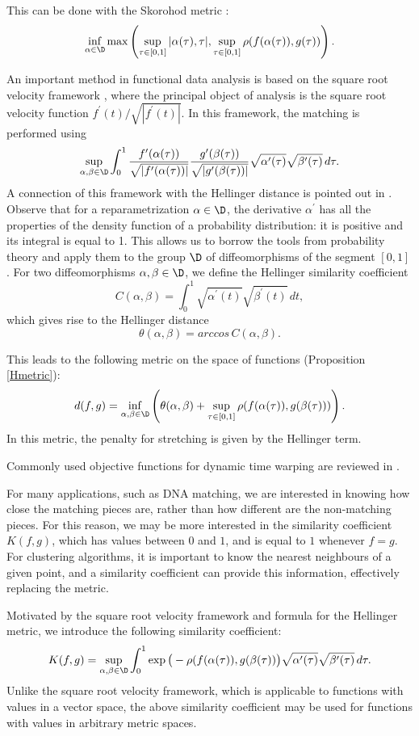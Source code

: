 \documentclass[12pt]{amsart}
\begin{document}
This can be done with the Skorohod metric \cite{S, B}:
\[\inf_{\alpha\in\D} \max \left(  \sup_{\tau \in [0,1]} |\alpha(\tau), \tau|, \sup_{\tau \in [0,1]} \rho(f(\alpha(\tau)), g(\tau)) \right).\]

An important method in functional data analysis is based on the square root velocity framework 
\cite{S, Br, SK}, where the principal object of analysis is the square root velocity function 
$f^\prime(t) / \sqrt{\left| f^\prime(t) \right|}$. In this framework, the matching is performed using
\[\sup_{\alpha, \beta \in \D} \int_0^1 
\frac{f^\prime(\alpha(\tau))}{\sqrt{\left| f^\prime(\alpha(\tau)) \right|}} 
\frac{g^\prime(\beta(\tau))}{\sqrt{\left| g^\prime(\beta(\tau)) \right|}} 
\sqrt{\alpha^\prime(\tau)} \sqrt{\beta^\prime(\tau)} \,d\tau.\]
A connection of this framework with the Hellinger distance is pointed out in \cite{SK}.
Observe that for a reparametrization $\alpha \in \D$, the derivative $\alpha^\prime$ has all the properties of the density function of a probability distribution: it is positive 
and its integral is equal to 1. This allows us to borrow the tools from probability theory and apply them to the group $\D$ of diffeomorphisms of the segment $[0,1]$. For two diffeomorphisms $\alpha, \beta \in \D$, we define the Hellinger similarity coefficient
\[C(\alpha, \beta) = \int_0^1 \sqrt{\alpha^\prime (t)} \sqrt{\beta^\prime (t)} \,dt,\]
which gives rise to the Hellinger distance
\[\theta(\alpha, \beta) = arccos \, C(\alpha, \beta).\]

This leads to the following metric on the space of functions (Proposition \ref{Hmetric}):
\[d(f, g) = \inf_{\alpha,\beta\in\D}  \left( \theta(\alpha, \beta) + \sup_{\tau \in [0,1]} \rho(f(\alpha(\tau)), g(\beta(\tau))) \right).\]
In this metric, the penalty for stretching is given by the Hellinger term.

Commonly used objective functions for dynamic time warping are reviewed in \cite{HMB}.

For many applications, such as DNA matching, we are interested in knowing how close the matching pieces are, rather than how different are the non-matching pieces. For this reason, we may be more interested in the similarity coefficient $K(f,g)$, which has values between $0$ and $1$, and is equal to $1$ whenever $f = g$. For clustering algorithms, it is important to know the nearest neighbours of a given point, and a similarity coefficient can provide this information, effectively replacing the metric.

Motivated by the square root velocity framework and formula for the Hellinger metric, we introduce the following similarity coefficient:
\[K (f, g) = \sup_{\alpha, \beta \in \D} \int_0^1 \exp\big(-\rho(f(\alpha(\tau)), g(\beta(\tau))\big) \sqrt{\alpha^\prime(\tau)} \sqrt{\beta^\prime(\tau)} \,d\tau.\]
Unlike the square root velocity framework, which is applicable to functions with values in a vector space, the above similarity coefficient may be used for functions with values in arbitrary metric spaces.
\end{document}
